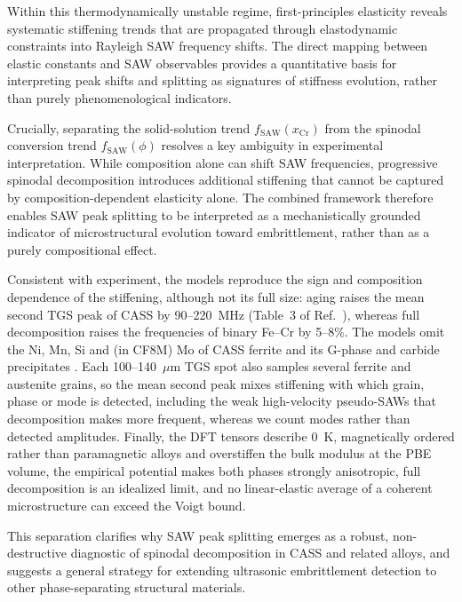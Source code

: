 \documentclass[final,3p,times]{elsarticle}
\begin{document}
Within this thermodynamically unstable regime, first-principles elasticity reveals systematic stiffening trends that are propagated through elastodynamic constraints into Rayleigh SAW frequency shifts. The direct mapping between elastic constants and SAW observables provides a quantitative basis for interpreting peak shifts and splitting as signatures of stiffness evolution, rather than purely phenomenological indicators.

Crucially, separating the solid-solution trend $f_{\mathrm{SAW}}(x_{\mathrm{Cr}})$ from the spinodal conversion trend $f_{\mathrm{SAW}}(\phi)$ resolves a key ambiguity in experimental interpretation. While composition alone can shift SAW frequencies, progressive spinodal decomposition introduces additional stiffening that cannot be captured by composition-dependent elasticity alone. The combined framework therefore enables SAW peak splitting to be interpreted as a mechanistically grounded indicator of microstructural evolution toward embrittlement, rather than as a purely compositional effect.

Consistent with experiment, the models reproduce the sign and composition dependence of the stiffening, although not its full size: aging raises the mean second TGS peak of CASS by 90--220~MHz (Table~3 of Ref.~\cite{al2023detecting}), whereas full decomposition raises the frequencies of binary Fe--Cr by 5--8\%. The models omit the Ni, Mn, Si and (in CF8M) Mo of CASS ferrite and its G-phase and carbide precipitates \cite{byun2016thermal,lach2020precipitation}. Each 100--140~$\mu$m TGS spot also samples several ferrite and austenite grains, so the mean second peak mixes stiffening with which grain, phase or mode is detected, including the weak high-velocity pseudo-SAWs that decomposition makes more frequent, whereas we count modes rather than detected amplitudes. Finally, the DFT tensors describe 0~K, magnetically ordered rather than paramagnetic alloys and overstiffen the bulk modulus at the PBE volume, the empirical potential makes both phases strongly anisotropic, full decomposition is an idealized limit, and no linear-elastic average of a coherent microstructure can exceed the Voigt bound.

This separation clarifies why SAW peak splitting emerges as a robust, non-destructive diagnostic of spinodal decomposition in CASS and related alloys, and suggests a general strategy for extending ultrasonic embrittlement detection to other phase-separating structural materials.
\end{document}

